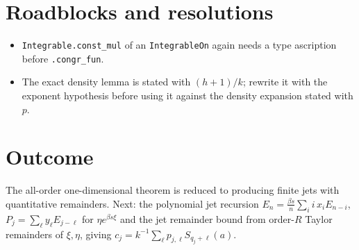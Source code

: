 \documentclass[11pt]{article}
\begin{document}
\section{Roadblocks and resolutions}
\begin{itemize}
\item \texttt{Integrable.const\_mul} of an \texttt{IntegrableOn} again needs a type ascription before
\texttt{.congr\_fun}.
\item The exact density lemma is stated with $(h+1)/k$; rewrite it with the exponent hypothesis before
using it against the density expansion stated with $p$.
\end{itemize}

\section{Outcome}
The all-order one-dimensional theorem is reduced to producing finite jets with quantitative remainders.
Next: the polynomial jet recursion $E_n=\frac{\beta s}{n}\sum_ii\,x_iE_{n-i}$, $P_j=\sum_\ell y_\ell
E_{j-\ell}$ for $\eta e^{\beta s\xi}$ and the jet remainder bound from order-$R$ Taylor remainders of
$\xi,\eta$, giving $c_j=k^{-1}\sum_\ell p_{j,\ell}S_{q_j+\ell}(a)$.
\end{document}
